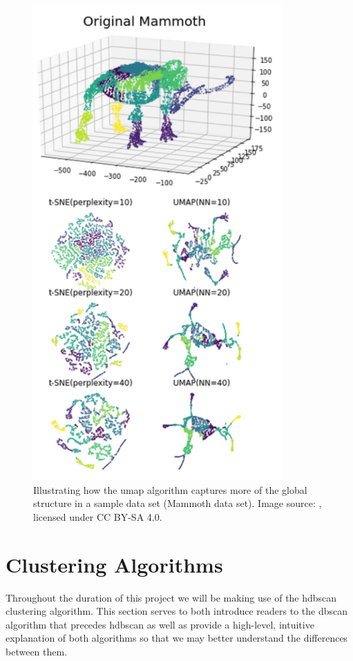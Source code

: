\begin{figure}[H]
    \centering
    \includegraphics[width=0.85\textwidth]{Images/Chapter 3/t-SNE/UMAP-Illustration.pdf}
    \caption{Illustrating how the \gls{umap} algorithm captures more of the global structure in a sample data set (Mammoth data set). Image source: \cite{Wang2}, licensed under CC BY-SA 4.0.}
    \label{fig:UMAP-Illustration}
\end{figure}

\clearpage

\section{Clustering Algorithms}
\label{sec:Background-Information:Clustering-Algorithms}
Throughout the duration of this project we will be making use of the \gls{hdbscan} clustering algorithm. This section serves to both introduce readers to the \gls{dbscan} algorithm that precedes \gls{hdbscan} as well as provide a high-level, intuitive explanation of both algorithms so that we may better understand the differences between them.

